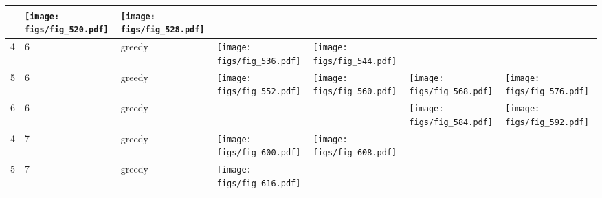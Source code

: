 \documentclass[oneside,canadian,landscape]{article}
\begin{document}
\begin{center}
\begin{longtable}{|l|l|l||l|l|l|l|}
\begin{minipage}{3.5cm}
\end{minipage}
&\begin{minipage}{3.5cm}
\texttt{[image: figs/fig\_520.pdf]}
\end{minipage}
&\begin{minipage}{3.5cm}
\texttt{[image: figs/fig\_528.pdf]}
\end{minipage}
\\ \hline
4&6&greedy&\begin{minipage}{3.5cm}
\texttt{[image: figs/fig\_536.pdf]}
\end{minipage}
&\begin{minipage}{3.5cm}
\texttt{[image: figs/fig\_544.pdf]}
\end{minipage}
&&\\ \hline
5&6&greedy&\begin{minipage}{3.5cm}
\texttt{[image: figs/fig\_552.pdf]}
\end{minipage}
&\begin{minipage}{3.5cm}
\texttt{[image: figs/fig\_560.pdf]}
\end{minipage}
&\begin{minipage}{3.5cm}
\texttt{[image: figs/fig\_568.pdf]}
\end{minipage}
&\begin{minipage}{3.5cm}
\texttt{[image: figs/fig\_576.pdf]}
\end{minipage}
\\ \hline
6&6&greedy&&&\begin{minipage}{3.5cm}
\texttt{[image: figs/fig\_584.pdf]}
\end{minipage}
&\begin{minipage}{3.5cm}
\texttt{[image: figs/fig\_592.pdf]}
\end{minipage}
\\ \hline
4&7&greedy&\begin{minipage}{3.5cm}
\texttt{[image: figs/fig\_600.pdf]}
\end{minipage}
&\begin{minipage}{3.5cm}
\texttt{[image: figs/fig\_608.pdf]}
\end{minipage}
&&\\ \hline
5&7&greedy&\begin{minipage}{3.5cm}
\texttt{[image: figs/fig\_616.pdf]}
\end{minipage}
&\begin{minipage}{3.5cm}

\end{minipage}
\end{longtable}
\end{center}
\end{document}
